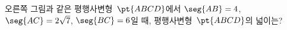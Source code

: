\noindent\begin{minipage}[t]{0.58\linewidth}\vspace{0pt}\raggedright 오른쪽 그림과 같은 평행사변형~$\pt{ABCD}$에서 $\seg{AB}=4$, $\seg{AC}=2\sqrt{7}$, $\seg{BC}=6$일 때, 평행사변형~$\pt{ABCD}$의 넓이는? \end{minipage}\hfill\begin{minipage}[t]{0.4\linewidth}\vspace{0pt}\centering \resizebox{\ifdim\width>\linewidth\linewidth\else\width\fi}{!}{}\end{minipage}\par
{}
